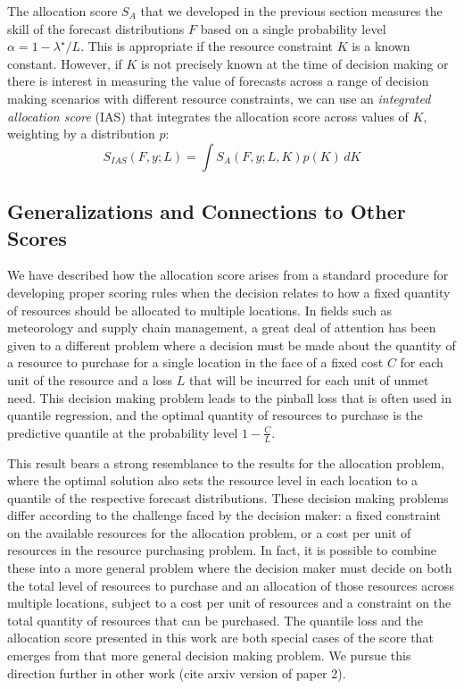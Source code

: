 \documentclass{article}
\begin{document}
The allocation score $S_A$ that we developed in the previous section measures the skill of the forecast distributions $F$ based on a single probability level $\alpha = 1 - \lambda^{\star}/L$. This is appropriate if the resource constraint $K$ is a known constant. However, if $K$ is not precisely known at the time of decision making or there is interest in measuring the value of forecasts across a range of decision making scenarios with different resource constraints, we can use an \emph{integrated allocation score} (IAS) that integrates the allocation score across values of $K$, weighting by a distribution $p$:
$$S_{IAS}(F, y; L) = \int S_A(F,y; L, K) p(K) \, dK$$


\subsection{Generalizations and Connections to Other Scores}
\label{sec:methods.related}

We have described how the allocation score arises from a standard procedure for developing proper scoring rules when the decision relates to how a fixed quantity of resources should be allocated to multiple locations. In fields such as meteorology and supply chain management, a great deal of attention has been given to a different problem where a decision must be made about the quantity of a resource to purchase for a single location in the face of a fixed cost $C$ for each unit of the resource and a loss $L$ that will be incurred for each unit of unmet need. This decision making problem leads to the pinball loss that is often used in quantile regression, and the optimal quantity of resources to purchase is the predictive quantile at the probability level $1 - \frac{C}{L}$.

This result bears a strong resemblance to the results for the allocation problem, where the optimal solution also sets the resource level in each location to a quantile of the respective forecast distributions. These decision making problems differ according to the challenge faced by the decision maker: a fixed constraint on the available resources for the allocation problem, or a cost per unit of resources in the resource purchasing problem. In fact, it is possible to combine these into a more general problem where the decision maker must decide on both the total level of resources to purchase and an allocation of those resources across multiple locations, subject to a cost per unit of resources and a constraint on the total quantity of resources that can be purchased. The quantile loss and the allocation score presented in this work are both special cases of the score that emerges from that more general decision making problem. We pursue this direction further in other work (cite arxiv version of paper 2).
\end{document}
